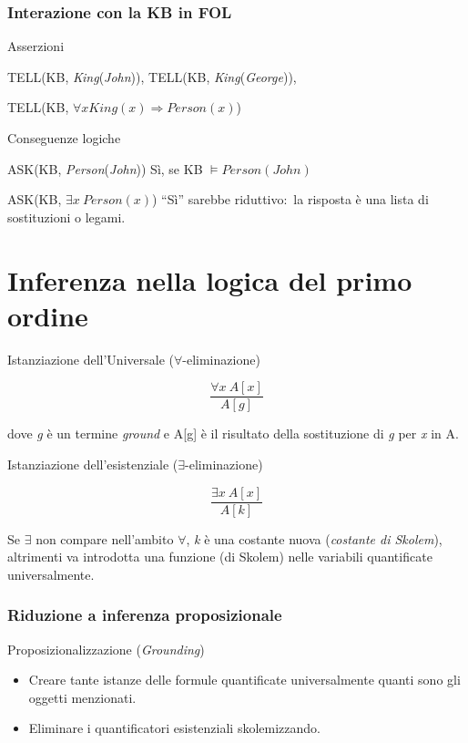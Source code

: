 \subsubsection{Interazione con la KB in FOL}

Asserzioni
\begin{flushleft}
	TELL(KB, \textit{King}(\textit{John})), TELL(KB, \textit{King}(\textit{George})),

	TELL(KB, $\forall x King(x) \Rightarrow Person(x)$)
\end{flushleft}

\noindent Conseguenze logiche

\begin{flushleft}
	ASK(KB, \textit{Person}(\textit{John})) \qquad Sì, se KB $\models Person(John)$

	ASK(KB, $\exists x\ Person(x)$) \qquad ``Sì'' sarebbe riduttivo:\ la risposta è una lista di sostituzioni o legami.
\end{flushleft}

\section{Inferenza nella logica del primo ordine}

Istanziazione dell’Universale ($\forall$-eliminazione)

\[
	\frac{\forall x\ A[x]}{A[g]}
\]

\noindent dove \textit{g} è un termine \textit{ground} e A[g] è il risultato della sostituzione di \textit{g} per \textit{x} in A.

\noindent Istanziazione dell'esistenziale ($\exists$-eliminazione)

\[ \frac{\exists x\ A[x]}{A[k]} \]

\noindent Se $\exists$ non compare nell'ambito $\forall$, \textit{k}
è una costante nuova (\textit{costante di Skolem}), altrimenti va introdotta una funzione (di Skolem) nelle variabili quantificate universalmente.

\subsubsection{Riduzione a inferenza proposizionale}

Proposizionalizzazione (\textit{Grounding})
\begin{itemize}
	\item Creare tante istanze delle formule quantificate universalmente quanti sono gli oggetti menzionati.
	\item Eliminare i quantificatori esistenziali skolemizzando.
\end{itemize}

